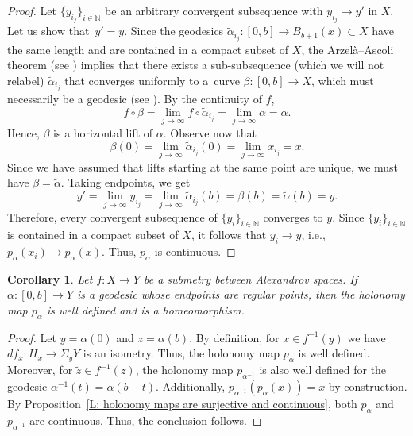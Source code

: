 \documentclass[pdftex]{sigma}
\numberwithin{equation}{section}
\newtheorem{cor}[thm]{Corollary}
\theoremstyle{definition}
\begin{document}
\begin{proof}
Let $\{y_{i_j}\}_{i\in\mathbb{N}}$ be an arbitrary convergent subsequence with $y_{i_j}\to y'$ in $X$. Let us show that~${y' = y}$. Since the geodesics $\tilde{\alpha}_{i_j}\colon [0,b]\to B_{b+1}(x)\subset X$ have the same length and are contained in a compact subset of $X$, the Arzel\`a--Ascoli theorem (see \cite[Theorem 2.5.14]{BuragoBuragoIvanov}) implies that there exists a sub-subsequence (which we will not relabel) $\tilde{\alpha}_{i_j}$ that converges uniformly to a~curve $\beta\colon [0,b]\to X$, which must necessarily be a geodesic (see \cite[Proposition 2.5.17]{BuragoBuragoIvanov}). By the continuity of $f$,
\[
f\circ \beta = \lim_{j\to \infty}f\circ \tilde{\alpha}_{i_j} = \lim_{j\to\infty}\alpha = \alpha.
\]
Hence, $\beta$ is a horizontal lift of $\alpha$. Observe now that
\[
\beta(0) = \lim_{j\to\infty}\tilde{\alpha}_{i_j}(0) = \lim_{j\to\infty} x_{i_j} = x.
\]
Since we have assumed that lifts starting at the same point are unique, we must have $\beta = \tilde{\alpha}$. Taking endpoints, we get
\[
y' = \lim_{j\to\infty}y_{i_j} = \lim_{j\to \infty}\tilde{\alpha}_{i_j}(b) = \beta(b) = \tilde{\alpha}(b) = y.
\]
Therefore, every convergent subsequence of $\{y_i\}_{i\in \mathbb{N}}$ converges to $y$. Since $\{y_i\}_{i\in \mathbb{N}}$ is contained in a compact subset of $X$, it follows that $y_i\to y$, i.e., $p_{\alpha}(x_i) \to p_\alpha(x)$. Thus, $p_\alpha$ is continuous.
\end{proof}






\begin{cor}\label{L: holonomy maps over regular leaves are homeomorphisms}
Let $f\colon X\to Y$ be a submetry between Alexandrov spaces. If $\alpha\colon [0,b]\to Y$ is a geodesic whose endpoints are regular points, then the holonomy map $p_\alpha$ is well defined and is a homeomorphism.
\end{cor}

\begin{proof}
Let $y = \alpha(0)$ and $z=\alpha(b)$. By definition, for $x\in f^{-1}(y)$ we have $df_x\colon H_x\to \Sigma_y Y$ is an isometry. Thus, the holonomy map $p_\alpha$ is well defined. Moreover, for $\tilde{z}\in f^{-1}(z)$, the holonomy map $p_{\alpha^{-1}}$ is also well defined for the geodesic $\alpha^{-1}(t)= \alpha(b-t)$. Additionally, $p_{\alpha^{-1}}(p_{\alpha}(x))=x$ by construction. By Proposition~\ref{L: holonomy maps are surjective and continuous}, both $p_\alpha$ and $p_{\alpha^{-1}}$ are continuous. Thus, the conclusion follows.
\end{proof}
\end{document}
